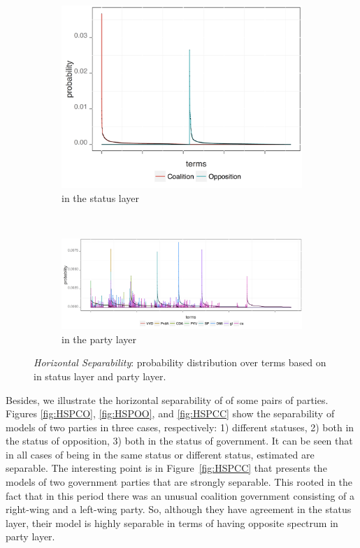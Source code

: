 \begin{figure}[t]
    \centering
    \begin{subfigure}[b]{0.32\textwidth}
\includegraphics[width=\linewidth]{02-part-01/chapter-03/figs_and_tables/img_opo-coa.png}
\caption{\label{fig:HSS}\achswlm in the status layer}
        \end{subfigure}
        ~ 
    \begin{subfigure}[b]{0.64\textwidth}
\includegraphics[width=\linewidth]{02-part-01/chapter-03/figs_and_tables/img_parties.png}
\caption{\label{fig:HSP}\achswlm in the party layer}
        \end{subfigure}
    \caption{\label{fig:HS} \emph{Horizontal Separability}: probability distribution over terms based on \hswlms in status layer and party layer.}
\end{figure}

Besides, we illustrate the horizontal separability of \achswlm of some pairs of parties. Figures \ref{fig:HSPCO}, \ref{fig:HSPOO}, and \ref{fig:HSPCC} show the separability of models of two parties in three cases, respectively: 1) different statuses, 2) both in the status of opposition, 3) both in the status of government. It can be seen that in all cases of being in the same status or different status, estimated \hswlms are separable. The interesting point is in Figure~\ref{fig:HSPCC} that presents the models of two government parties that are strongly separable. This rooted in the fact that in this period there was an unusual coalition government consisting of a right\:-\:wing and a left\:-\:wing party. So, although they have agreement in the status layer, their model is highly separable in terms of having opposite spectrum in party layer.


